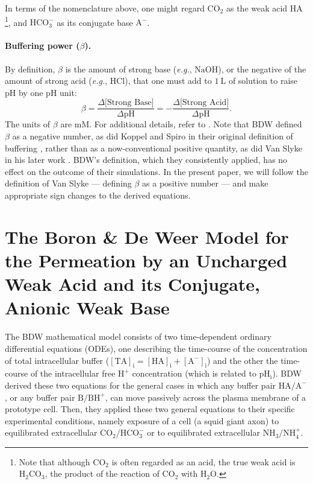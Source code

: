 \documentclass[fleqn,10pt]{physiome}
\begin{document}
In terms of the nomenclature above, one might regard $\mathrm{CO_2}$ as the weak acid $\mathrm{HA}$\footnote{Note that although $\mathrm{CO_2}$ is often regarded as an acid, the true weak acid is $\mathrm{H_2CO_3}$, the product of the reaction of $\mathrm{CO_2}$ with $\mathrm{H_2O}$.}, and $\mathrm{HCO_3^-}$ as its conjugate base $\mathrm{A^-}$.

\paragraph{Buffering power ($\beta$).}

By definition, $\beta$ is the amount of strong base (\emph{e.g.}, $\mathrm{NaOH}$), or the negative of the amount of strong acid (\emph{e.g.}, $\mathrm{HCl}$), that one must add to $1~\mathrm{L}$ of solution to raise $\mathrm{pH}$ by one $\mathrm{pH}$ unit:
\begin{equation}
\beta=\dfrac{\Delta\text{[Strong~Base]}}{\Delta \mathrm{pH}}=-\dfrac{\Delta\text{[Strong~Acid]}}{\Delta \mathrm{pH}}.
\label{eqn:buffer}
\end{equation}
The units of $\beta$ are $\mathrm{mM}$. For additional details, refer to \cite{roos1981intracellular,boron2016medical}. Note that BDW defined $\beta$ as a negative number, as did Koppel and Spiro in their original definition of buffering \citep{koppel1914wirkung,roos1980buffer}, rather than as a now-conventional positive quantity, as did Van Slyke in his later work \citep{van1922measurement}. BDW's definition, which they consistently applied, has no effect on the outcome of their simulations. In the present paper, we will follow the definition of Van Slyke --- defining $\beta$ as a positive number --- and make appropriate sign changes to the derived equations.

\section{The Boron \& De Weer Model for the Permeation by an Uncharged Weak Acid and its Conjugate, Anionic Weak Base}

The BDW mathematical model consists of two time-dependent ordinary differential equations (ODEs), one describing the time-course of the concentration of total intracellular buffer ($\mathrm{[TA]_i} = \mathrm{[HA]_i}+\mathrm{[A^-]_i}$) and the other the time-course of the intracellular free $\mathrm{H^+}$ concentration (which is related to $\mathrm{pH_i}$). BDW derived these two equations for the general cases in which any buffer pair $\mathrm{HA}/\mathrm{A^-}$, or any buffer pair $\mathrm{B}/\mathrm{BH^+}$, can move passively across the plasma membrane of a prototype cell. Then, they applied these two general equations to their specific experimental conditions, namely exposure of a cell (a squid giant axon) to equilibrated extracellular $\mathrm{CO_2}/\mathrm{HCO_3^-}$ or to equilibrated extracellular $\mathrm{NH_3}/\mathrm{NH_4^+}$.
\end{document}
